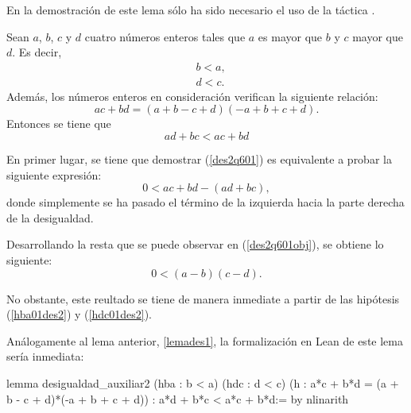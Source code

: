 En la demostración de este lema sólo ha sido necesario el uso de la
táctica .

\begin{lema}\label{lemades2}
  Sean \(a\), \(b\), \(c\) y \(d\) cuatro números enteros tales que \(a\) es
  mayor que \(b\) y \(c\) mayor que \(d\). Es decir,
  \begin{align}
    &b<a,\tag{hba}\label{hba01des2}\\
    &d<c.\tag{hdc}\label{hdc01des2}
  \end{align}
  Además, los números enteros en consideración verifican la siguiente relación:
    \begin{equation}\tag{h}
      ac+bd = (a+b-c+d)(-a+b+c+d).
    \end{equation}
    Entonces se tiene que
    \begin{equation}\label{des2q601}
      ad+bc < ac+bd
    \end{equation}
\end{lema}

\begin{demostracion}
  En primer lugar, se tiene que demostrar (\ref{des2q601}) es equivalente a
  probar la siguiente expresión:
  \begin{equation}\label{des2q601obj}
      0<ac+bd-(ad+bc),
  \end{equation}
  donde simplemente se ha pasado el término de la izquierda hacia la parte
  derecha de la desigualdad.

  Desarrollando la resta que se puede observar en (\ref{des2q601obj}), se
  obtiene lo siguiente:
  \begin{equation}
    0<(a-b)(c-d).
  \end{equation}

  No obstante, este reultado se tiene de manera inmediate a partir de las
  hipótesis (\ref{hba01des2}) y (\ref{hdc01des2}).
\end{demostracion}

Análogamente al lema anterior, \ref{lemades1}, la formalización en Lean de
este lema sería inmediata:
\begin{leancode}
lemma desigualdad_auxiliar2
  (hba : b < a)
  (hdc : d < c)
  (h : a*c + b*d = (a + b - c + d)*(-a + b + c + d))
  : a*d + b*c < a*c + b*d:=
by nlinarith
\end{leancode}


